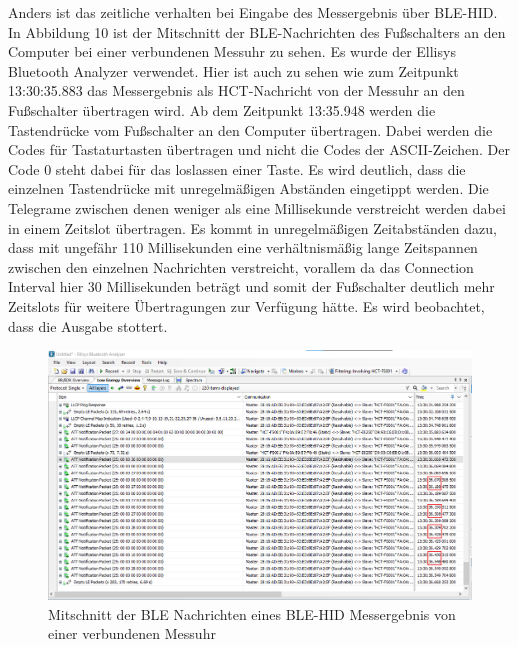 Anders ist das zeitliche verhalten bei Eingabe des Messergebnis über BLE-HID. In Abbildung 10 ist der Mitschnitt der BLE-Nachrichten des Fußschalters an den Computer bei einer verbundenen Messuhr zu sehen. Es wurde der Ellisys Bluetooth Analyzer verwendet. Hier ist auch zu sehen wie zum Zeitpunkt 13:30:35.883 das Messergebnis als HCT-Nachricht von der Messuhr an den Fußschalter übertragen wird. Ab dem Zeitpunkt 13:35.948 werden die Tastendrücke vom Fußschalter an den Computer übertragen. Dabei werden die Codes für Tastaturtasten übertragen und nicht die Codes der ASCII-Zeichen. Der Code 0 steht dabei für das loslassen einer Taste. Es wird deutlich, dass die einzelnen Tastendrücke mit unregelmäßigen Abständen eingetippt werden. Die Telegrame zwischen denen weniger als eine Millisekunde verstreicht werden dabei in einem Zeitslot übertragen. Es kommt in unregelmäßigen Zeitabständen dazu, dass mit ungefähr 110 Millisekunden eine verhältnismäßig lange Zeitspannen zwischen den einzelnen Nachrichten verstreicht, vorallem da das Connection Interval hier 30 Millisekunden beträgt und somit der Fußschalter deutlich mehr Zeitslots für weitere Übertragungen zur Verfügung hätte. Es wird beobachtet, dass die Ausgabe stottert.
\begin{figure}[H] 
	\centering
	\includegraphics[width=\textwidth]{figures/BLEHID1device.png}
	\caption{Mitschnitt der BLE Nachrichten eines BLE-HID Messergebnis von einer verbundenen Messuhr}
\end{figure}

